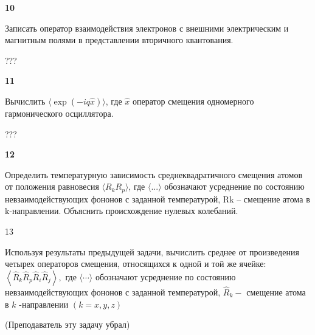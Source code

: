 \documentclass[a4paper,12pt]{article} %
\begin{document}
\begin{task}

\textbf{10}

Записать оператор взаимодействия электронов с внешними электрическим и магнитным полями в представлении вторичного квантования.



???







\end{task}


\begin{task}

\textbf{11}

Вычислить  $\langle\exp (-i q \hat{x})\rangle$, где  $\hat{x}$ оператор смещения одномерного гармонического осциллятора.



???










\end{task}


\begin{task}

\textbf{12}

Определить температурную зависимость среднеквадратичного смещения атомов от положения равновесия $ \langle R_k R_p \rangle$, 
где $ \langle ... \rangle$ обозначают усреднение по состоянию невзаимодействующих фононов с заданной температурой,  Rk – смещение атома в k-направлении. Объяснить происхождение нулевых колебаний.













\end{task}


\begin{task}

13

Используя результаты предыдущей задачи, вычислить среднее от произведения четырех операторов смещения, относящихся к одной и той же ячейке: $\left\langle\hat{R}_{k} \hat{R}_{p} \hat{R}_{i} \hat{R}_{j}\right\rangle,$ где $\langle\cdots\rangle$ обозначают усреднение по состоянию невзаимодействующих фононов с заданной температурой, $\hat{R}_{k}-$ смещение атома в $k$ -направлении $(k=x, y, z)$

(Преподаватель эту задачу убрал)














\end{task}
\end{document}
